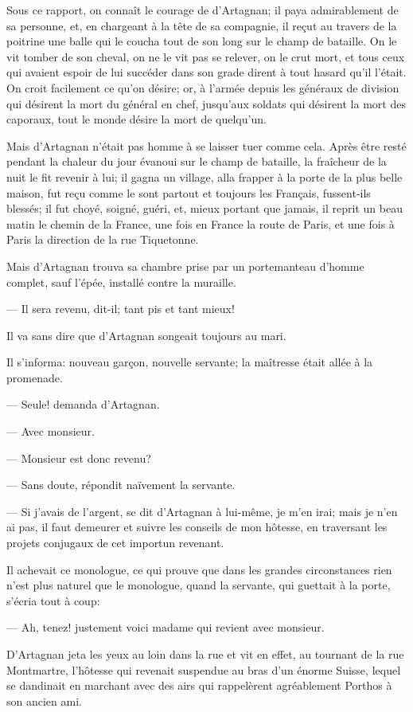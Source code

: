 Sous ce rapport, on connaît le courage de d'Artagnan; il paya admirablement de sa personne, et, en chargeant à la tête de sa compagnie, il reçut au travers de la poitrine une balle qui le coucha tout de son long sur le champ de bataille. On le vit tomber de son cheval, on ne le vit pas se relever, on le crut mort, et tous ceux qui avaient espoir de lui succéder dans son grade dirent à tout hasard qu'il l'était. On croit facilement ce qu'on désire; or, à l'armée depuis les généraux de division qui désirent la mort du général en chef, jusqu'aux soldats qui désirent la mort des caporaux, tout le monde désire la mort de quelqu'un.

Mais d'Artagnan n'était pas homme à se laisser tuer comme cela. Après être resté pendant la chaleur du jour évanoui sur le champ de bataille, la fraîcheur de la nuit le fit revenir à lui; il gagna un village, alla frapper à la porte de la plus belle maison, fut reçu comme le sont partout et toujours les Français, fussent-ils blessés; il fut choyé, soigné, guéri, et, mieux portant que jamais, il reprit un beau matin le chemin de la France, une fois en France la route de Paris, et une fois à Paris la direction de la rue Tiquetonne.

Mais d'Artagnan trouva sa chambre prise par un portemanteau d'homme complet, sauf l'épée, installé contre la muraille.

— Il sera revenu, dit-il; tant pis et tant mieux!

Il va sans dire que d'Artagnan songeait toujours au mari.

Il s'informa: nouveau garçon, nouvelle servante; la maîtresse était allée à la promenade.

— Seule! demanda d'Artagnan.

— Avec monsieur.

— Monsieur est donc revenu?

— Sans doute, répondit naïvement la servante.

— Si j'avais de l'argent, se dit d'Artagnan à lui-même, je m'en irai; mais je n'en ai pas, il faut demeurer et suivre les conseils de mon hôtesse, en traversant les projets conjugaux de cet importun revenant.

Il achevait ce monologue, ce qui prouve que dans les grandes circonstances rien n'est plus naturel que le monologue, quand la servante, qui guettait à la porte, s'écria tout à coup:

— Ah, tenez! justement voici madame qui revient avec monsieur.

D'Artagnan jeta les yeux au loin dans la rue et vit en effet, au tournant de la rue Montmartre, l'hôtesse qui revenait suspendue au bras d'un énorme Suisse, lequel se dandinait en marchant avec des airs qui rappelèrent agréablement Porthos à son ancien ami.

